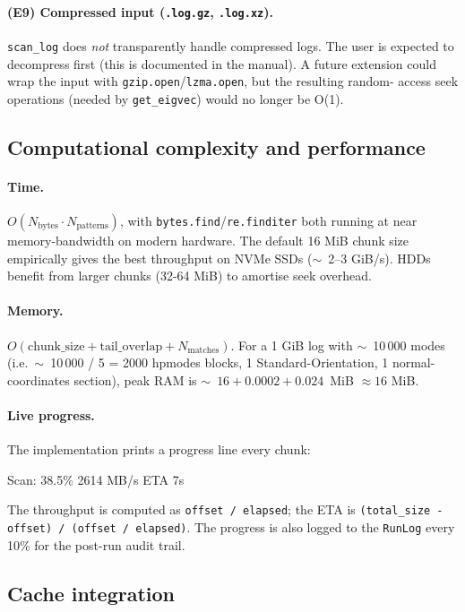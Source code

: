 \documentclass[10pt,a4paper,twoside]{article}
\newcommand{\fn}[1]{\texttt{#1}}
\begin{document}
\paragraph{(E9) Compressed input (\texttt{.log.gz}, \texttt{.log.xz}).}
\fn{scan\_log} does \emph{not} transparently handle compressed
logs. The user is expected to decompress first (this is documented
in the manual). A future extension could wrap the input with
\texttt{gzip.open}/\texttt{lzma.open}, but the resulting random-
access seek operations (needed by \fn{get\_eigvec}) would no longer
be O(1).

\subsection{Computational complexity and performance}

\paragraph{Time.}
$O(N_\text{bytes} \cdot N_\text{patterns})$, with
\fn{bytes.find}/\fn{re.finditer} both running at near memory-bandwidth
on modern hardware. The default 16 MiB chunk size empirically
gives the best throughput on NVMe SSDs ($\sim$~2--3 GiB/s). HDDs
benefit from larger chunks (32-64 MiB) to amortise seek overhead.

\paragraph{Memory.}
$O(\text{chunk\_size} + \text{tail\_overlap} + N_\text{matches})$.
For a 1 GiB log with $\sim$~10\,000 modes (i.e.\
$\sim$~10\,000 / 5 = 2000 hpmodes blocks, 1 Standard-Orientation,
1 normal-coordinates section), peak RAM is
$\sim$~$16 + 0.0002 + 0.024$~MiB ${} \approx 16$ MiB.

\paragraph{Live progress.}
The implementation prints a progress line every chunk:
\begin{bytebox}
Scan: 38.5\% 2614 MB/s ETA 7s
\end{bytebox}
The throughput is computed as \texttt{offset / elapsed}; the ETA
is \texttt{(total\_size - offset) / (offset / elapsed)}. The
progress is also logged to the \fn{RunLog} every 10\% for the
post-run audit trail.

\subsection{Cache integration}
\end{document}
